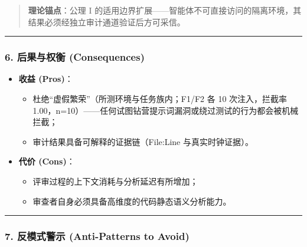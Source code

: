 \documentclass[
]{ctexart}
\providecommand{\tightlist}{%
  \setlength{\itemsep}{0pt}\setlength{\parskip}{0pt}}
\renewcommand{\_}{\discretionary{}{}{\textunderscore}}
\begin{document}
\begin{quote}
\textbf{理论锚点}：公理 I
的适用边界扩展------智能体不可直接访问的隔离环境，其结果必须经独立审计通道验证后方可采信。
\end{quote}

\begin{center}\rule{0.5\linewidth}{0.5pt}\end{center}

\subsubsection{6. 后果与权衡
(Consequences)}\label{ux540eux679cux4e0eux6743ux8861-consequences-1}

\begin{itemize}
\tightlist
\item
  \textbf{收益 (Pros)}：

  \begin{itemize}
  \tightlist
  \item
    杜绝``虚假繁荣''（所测环境与任务族内；F1/F2 各 10 次注入，拦截率
    1.00，n=10）------任何试图钻营提示词漏洞或绕过测试的行为都会被机械拦截；
  \item
    审计结果具备可解释的证据链（File:Line 与真实时钟证据）。
  \end{itemize}
\item
  \textbf{代价 (Cons)}：

  \begin{itemize}
  \tightlist
  \item
    评审过程的上下文消耗与分析延迟有所增加；
  \item
    审查者自身必须具备高维度的代码静态语义分析能力。
  \end{itemize}
\end{itemize}

\begin{center}\rule{0.5\linewidth}{0.5pt}\end{center}

\subsubsection{7. 反模式警示 (Anti-Patterns to
Avoid)}\label{ux53cdux6a21ux5f0fux8b66ux793a-anti-patterns-to-avoid-1}
\end{document}
